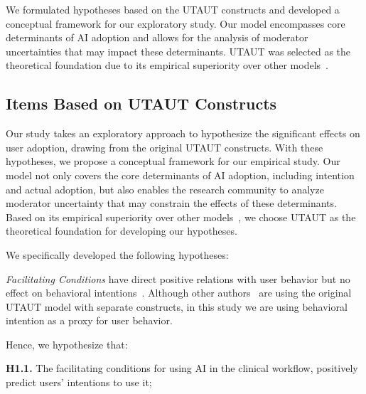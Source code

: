 We formulated hypotheses based on the UTAUT constructs and developed a conceptual framework for our exploratory study.
Our model encompasses core determinants of AI adoption and allows for the analysis of moderator uncertainties that may impact these determinants.
UTAUT was selected as the theoretical foundation due to its empirical superiority over other models~\cite{AJZEN1991179, RePEc:inm:ormnsc:v:35:y:1989:i:8:p:982-1003}.

\subsection{Items Based on UTAUT Constructs}
\label{sec:chap004003001}

Our study takes an exploratory approach to hypothesize the significant effects on user adoption, drawing from the original UTAUT constructs.
With these hypotheses, we propose a conceptual framework for our empirical study.
Our model not only covers the core determinants of AI adoption, including intention and actual adoption, but also enables the research community to analyze moderator uncertainty that may constrain the effects of these determinants.
Based on its empirical superiority over other models~\cite{AJZEN1991179, RePEc:inm:ormnsc:v:35:y:1989:i:8:p:982-1003}, we choose UTAUT as the theoretical foundation for developing our hypotheses.

\vspace{2.25mm}

\noindent
We specifically developed the following hypotheses:

\vspace{2.25mm}

{\it Facilitating Conditions} have direct positive relations with user behavior but no effect on behavioral intentions~\cite{10.2307/30036540}.
Although other authors~\cite{KHALILZADEH2017460} are using the original UTAUT model with separate constructs, in this study we are using behavioral intention as a proxy for user behavior.

\vspace{2.25mm}

\noindent
Hence, we hypothesize that:

\vspace{2.25mm}

\noindent
{\bf H1.1.} The facilitating conditions for using AI in the clinical workflow, positively predict users' intentions to use it;

\vspace{2.25mm}

